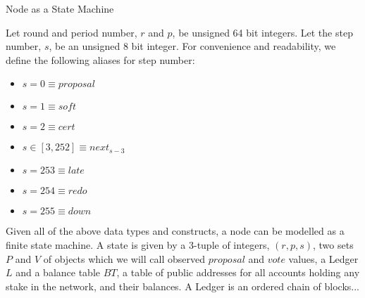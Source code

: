 \documentclass[10pt,a4paper]{article}
\begin{document}
\begin{section}{Node as a State Machine}

Let round and period number, $r$ and $p$, be unsigned 64 bit integers. Let the 
step number, $s$, be an unsigned  8 bit integer.
For convenience and readability, we define the following aliases for step number:
\begin{itemize}
    \item $s=0 \equiv proposal$
    \item $s=1 \equiv soft$
    \item $s=2 \equiv cert$
    \item $s \in [3,252] \equiv next_{s-3}$
    \item $s=253 \equiv late$
    \item $s=254 \equiv redo$
    \item $s=255 \equiv down$
\end{itemize}

Given all of the above data types and constructs, a node can be modelled as 
a finite state machine. A state is given by a 3-tuple of integers, $(r, p, s)$, 
two sets $P$ and $V$ of objects which we will call observed $proposal$ and $vote$ values, 
a Ledger $L$ and a balance table $BT$, a table of public addresses for all 
accounts holding any stake in the network, and their balances. A Ledger is an 
ordered chain of blocks...



\end{section}
\end{document}
